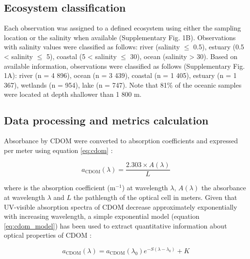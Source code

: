 \subsection*{Ecosystem classification}

Each observation was assigned to a defined ecosystem using either the sampling location or the salinity when available (Supplementary Fig. 1B). Observations with salinity values were classified as follows: river (salinity $\le$ 0.5), estuary (0.5 < salinity $\le$ 5), coastal (5 < salinity $\le$ 30), ocean (salinity > 30). Based on available information, observations were classified as follows (Supplementary Fig. 1A): river (n = 4 896), ocean (n = 3 439), coastal (n = 1 405), estuary (n = 1 367), wetlands (n = 954), lake (n = 747). Note that 81\% of the oceanic samples were located at depth shallower than 1 800 m.

\subsection*{Data processing and metrics calculation}

Absorbance by CDOM were converted to absorption coefficients and expressed per meter using equation \ref{eq:cdom} \citep{Kirk1994}:

\begin{equation}
  a_{\text{CDOM}}(\lambda) = \frac{2.303 \times A(\lambda)}{L}
  \label{eq:cdom}
\end{equation}

where \acdom{\lambda} is the absorption coefficient (m$^{-1}$) at wavelength $\lambda$, $A(\lambda)$ the absorbance at wavelength $\lambda$ and $L$ the pathlength of the optical cell in meters. Given that UV-visible absorption spectra of CDOM decrease approximately exponentially with increasing wavelength, a simple exponential model (equation \ref{eq:cdom_model}) has been used to extract quantitative information about optical properties of CDOM \citep{Jerlov1968, Bricaud1981, Stedmon2001}:

\begin{equation}
  a_{\text{CDOM}}(\lambda) = a_{\text{CDOM}}(\lambda_0)e^{-S(\lambda - \lambda_0)} + K
  \label{eq:cdom_model}
\end{equation}


